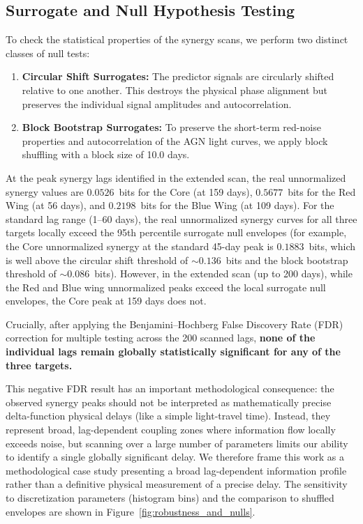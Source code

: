 \documentclass[fleqn,usenatbib]{mnras}
\begin{document}
\subsection{Surrogate and Null Hypothesis Testing}

To check the statistical properties of the synergy scans, we perform two distinct classes of null tests:
\begin{enumerate}
\item \textbf{Circular Shift Surrogates:} The predictor signals are circularly shifted relative to one another. This destroys the physical phase alignment but preserves the individual signal amplitudes and autocorrelation.
\item \textbf{Block Bootstrap Surrogates:} To preserve the short-term red-noise properties and autocorrelation of the AGN light curves, we apply block shuffling with a block size of 10.0 days.
\end{enumerate}

At the peak synergy lags identified in the extended scan, the real unnormalized synergy values are $0.0526$~bits for the Core (at 159 days), $0.5677$~bits for the Red Wing (at 56 days), and $0.2198$~bits for the Blue Wing (at 109 days). For the standard lag range (1--60 days), the real unnormalized synergy curves for all three targets locally exceed the 95th percentile surrogate null envelopes (for example, the Core unnormalized synergy at the standard 45-day peak is $0.1883$~bits, which is well above the circular shift threshold of $\sim 0.136$~bits and the block bootstrap threshold of $\sim 0.086$~bits). However, in the extended scan (up to 200 days), while the Red and Blue wing unnormalized peaks exceed the local surrogate null envelopes, the Core peak at 159 days does not.

Crucially, after applying the Benjamini–Hochberg False Discovery Rate (FDR) correction for multiple testing across the 200 scanned lags, \textbf{none of the individual lags remain globally statistically significant for any of the three targets.} 

This negative FDR result has an important methodological consequence: the observed synergy peaks should not be interpreted as mathematically precise delta-function physical delays (like a simple light-travel time). Instead, they represent broad, lag-dependent coupling zones where information flow locally exceeds noise, but scanning over a large number of parameters limits our ability to identify a single globally significant delay. We therefore frame this work as a methodological case study presenting a broad lag-dependent information profile rather than a definitive physical measurement of a precise delay. The sensitivity to discretization parameters (histogram bins) and the comparison to shuffled envelopes are shown in Figure~\ref{fig:robustness_and_nulls}.
\end{document}

